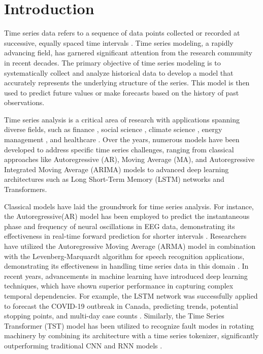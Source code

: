 \documentclass[sn-mathphys-num]{sn-jnl}
\theoremstyle{thmstyleone}%
\theoremstyle{thmstyletwo}%
\theoremstyle{thmstylethree}%
\begin{document}

\maketitle

\section{Introduction}\label{sec1}
Time series data refers to a sequence of data points collected or recorded at successive, equally spaced time intervals \cite{adhikari2013introductory}. Time series modeling, a rapidly advancing field, has garnered significant attention from the research community in recent decades. The primary objective of time series modeling is to systematically collect and analyze historical data to develop a model that accurately represents the underlying structure of the series. This model is then used to predict future values or make forecasts based on the history of past observations. 

Time series analysis is a critical area of research with applications spanning diverse fields, such as finance \cite{kim2011time}, social science \cite{box2014time}, climate science \cite{mudelsee2010climate}, energy management \cite{chou2018forecasting}, and healthcare \cite{gao2020time}. Over the years, numerous models have been developed to address specific time series challenges, ranging from classical approaches like Autoregressive (AR), Moving Average (MA), and Autoregressive Integrated Moving Average (ARIMA) models to advanced deep learning architectures such as Long Short-Term Memory (LSTM) networks and Transformers.

Classical models have laid the groundwork for time series analysis. For instance, the Autoregressive(AR) model has been employed to predict the instantaneous phase and frequency of neural oscillations in EEG data, demonstrating its effectiveness in real-time forward prediction for shorter intervals \cite{shakeel2020time}. Researchers have utilized the Autoregressive Moving Average (ARMA) model in combination with the Levenberg-Marquardt algorithm for speech recognition applications, demonstrating its effectiveness in handling time series data in this domain \cite{jafari2024speech}. In recent years, advancements in machine learning have introduced deep learning techniques, which have shown superior performance in capturing complex temporal dependencies. For example, the LSTM network was successfully applied to forecast the COVID-19 outbreak in Canada, predicting trends, potential stopping points, and multi-day case counts \cite{chimmula2020time}. Similarly, the Time Series Transformer (TST) model has been utilized to recognize fault modes in rotating machinery by combining its architecture with a time series tokenizer, significantly outperforming traditional CNN and RNN models \cite{jin2022time}. 
\end{document}
